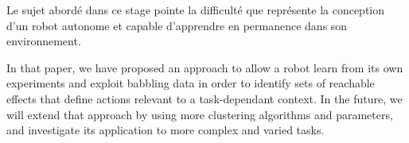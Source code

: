 \documentclass{llncs}
\begin{document}
Le sujet abordé dans ce stage pointe la difficulté que représente la conception d'un robot autonome et capable d'apprendre en permanence dans son environnement.

In that paper, we have proposed an approach to allow a robot learn from its own experiments and exploit babbling data in order to identify sets of reachable effects that define actions relevant to a task-dependant context. In the future, we will extend that approach by using more clustering algorithms and parameters, and investigate its application to more complex and varied tasks.




\end{document}
